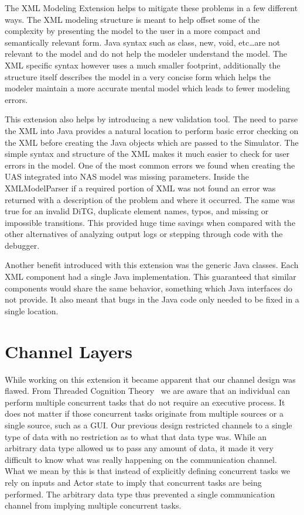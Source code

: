 The XML Modeling Extension helps to mitigate these problems in a few different ways.  The XML modeling structure is meant to help offset some of the complexity by presenting the model to the user in a more compact and semantically relevant form.  Java syntax such as class, new, void, etc\ldots are not relevant to the model and do not help the modeler understand the model.  The XML specific syntax however uses a much smaller footprint, additionally the structure itself describes the model in a very concise form which helps the modeler maintain a more accurate mental model which leads to fewer modeling errors.

This extension also helps by introducing a new validation tool.  The need to parse the XML into Java provides a natural location to perform basic error checking on the XML before creating the Java objects which are passed to the Simulator. The simple syntax and structure of the XML makes it much easier to check for user errors in the model.  One of the most common errors we found when creating the UAS integrated into NAS model was missing parameters.  Inside the XMLModelParser if a required portion of XML was not found an error was returned with a description of the problem and where it occurred.  The same was true for an invalid DiTG, duplicate element names, typos, and missing or impossible transitions.  This provided huge time savings when compared with the other alternatives of analyzing output logs or stepping through code with the debugger.

Another benefit introduced with this extension was the generic Java classes.  Each XML component had a single Java implementation.  This guaranteed that similar components would share the same behavior, something which Java interfaces do not provide.  It also meant that bugs in the Java code only needed to be fixed in a single location.

\section{Channel Layers}

While working on this extension it became apparent that our channel design was flawed.  From Threaded Cognition Theory~\cite{salvucci2008threaded} we are aware that an individual can perform multiple concurrent tasks that do not require an executive process.  It does not matter if those concurrent tasks originate from multiple sources or a single source, such as a GUI.  Our previous design restricted channels to a single type of data with no restriction as to what that data type was.  While an arbitrary data type allowed us to pass any amount of data, it made it very difficult to know what was really happening on the communication channel.  What we mean by this is that instead of explicitly defining concurrent tasks we rely on inputs and Actor state to imply that concurrent tasks are being performed.  The arbitrary data type thus prevented a single communication channel from implying multiple concurrent tasks.

